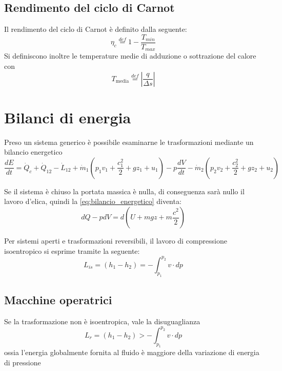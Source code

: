 \documentclass[a4paper,12pt]{article}
\begin{document}
\subsection{Rendimento del ciclo di Carnot}
\label{subsec:rendimento_carnot}
Il rendimento del ciclo di Carnot è definito dalla seguente:
\begin{equation}
    \eta_c \stackrel{def}{=} 1 - \frac{T_{min}}{T_{max}}
\end{equation}
Si definiscono inoltre le temperature medie di adduzione o sottrazione del calore con
\begin{equation}
    T_{\text{media}} \stackrel{def}{=} \left|\frac{q}{\Delta s}\right|
\end{equation}

\section{Bilanci di energia}
\label{sec:bilanci_energia}
Preso un sistema generico è possibile esaminarne le trasformazioni mediante un bilancio
energetico
\begin{equation}
    \label{eq:bilancio_energetico}
    \frac{dE}{dt} = \dot{Q}_c + \dot{Q}_{12} - \dot{L}_{12} + \dot{m}_1
    (p_1v_1 + \frac{c^2_1}{2} + gz_1 + u_1) -p\frac{dV}{dt} - \dot{m}_2
    (p_2v_2 + \frac{c^2_2}{2} + gz_2 + u_2)
\end{equation}

Se il sistema è chiuso la portata massica è nulla, di conseguenza sarà nullo il lavoro
d'elica, quindi la \eqref{eq:bilancio_energetico} diventa:
\begin{equation}
    \label{eq:I_principio_gen_chiusi}
    dQ - pdV = d\left(U+mgz+m\frac{c^2}{2}\right)
\end{equation}

Per sistemi aperti e trasformazioni reversibili, il lavoro di compressione isoentropico
si esprime tramite la seguente:
\begin{equation}
    \label{eq:lavoro_compressione_isoentropico}
    L_{is} = (h_1 - h_2) = - \int_{p_1}^{p_2} v \cdot dp
\end{equation}

\subsection{Macchine operatrici}
\label{subsec:macchine_operatrici}
Se la trasformazione non è isoentropica, vale la disuguaglianza
\begin{equation}
    L_r = (h_1 - h_2) > - \int_{p_1}^{p_2} v \cdot dp
\end{equation}
ossia l'energia globalmente fornita al fluido è maggiore della variazione di
energia di pressione
\end{document}
